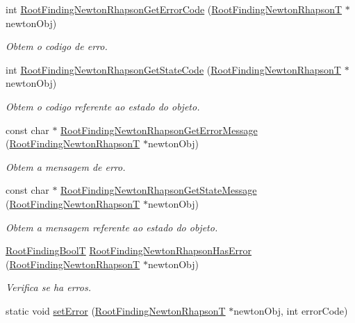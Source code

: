 \begin{CompactItemize}
int \hyperlink{group____newton_ga8599365ab3f0770158719cdd32eb5c3}{RootFindingNewtonRhapsonGetErrorCode} (\hyperlink{structRootFindingNewtonRhapson}{RootFindingNewtonRhapsonT} $\ast$newtonObj)
\begin{CompactList}\small\item\em Obtem o codigo de erro. \item\end{CompactList}\item 
int \hyperlink{group____newton_g9d87a4beccc7b61365f6b680fc1a4355}{RootFindingNewtonRhapsonGetStateCode} (\hyperlink{structRootFindingNewtonRhapson}{RootFindingNewtonRhapsonT} $\ast$newtonObj)
\begin{CompactList}\small\item\em Obtem o codigo referente ao estado do objeto. \item\end{CompactList}\item 
const char $\ast$ \hyperlink{group____newton_gcbbd94963ebd3ddbaf6bf4e9ce1c0a1f}{RootFindingNewtonRhapsonGetErrorMessage} (\hyperlink{structRootFindingNewtonRhapson}{RootFindingNewtonRhapsonT} $\ast$newtonObj)
\begin{CompactList}\small\item\em Obtem a mensagem de erro. \item\end{CompactList}\item 
const char $\ast$ \hyperlink{group____newton_g70436f650ac07866bb8d9897908f4422}{RootFindingNewtonRhapsonGetStateMessage} (\hyperlink{structRootFindingNewtonRhapson}{RootFindingNewtonRhapsonT} $\ast$newtonObj)
\begin{CompactList}\small\item\em Obtem a mensagem referente ao estado do objeto. \item\end{CompactList}\item 
\hyperlink{RootFindingCommon_8h_31228d356f5429fa5ba7f206e4dee12f}{RootFindingBoolT} \hyperlink{group____newton_g6d26d28c2bf14b9bf4072c6ccd70269f}{RootFindingNewtonRhapsonHasError} (\hyperlink{structRootFindingNewtonRhapson}{RootFindingNewtonRhapsonT} $\ast$newtonObj)
\begin{CompactList}\small\item\em Verifica se ha erros. \item\end{CompactList}\item 
static void \hyperlink{group____newton_g5d327a5dbdddddf1f6f5a68e7089031b}{setError} (\hyperlink{structRootFindingNewtonRhapson}{RootFindingNewtonRhapsonT} $\ast$newtonObj, int errorCode)

\end{CompactItemize}
